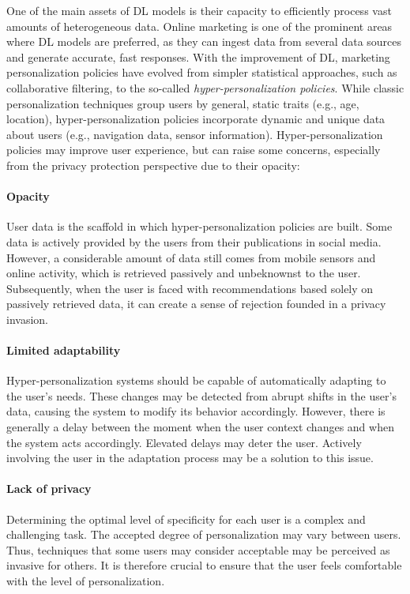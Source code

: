 One of the main assets of DL models is their capacity to efficiently process vast amounts of heterogeneous data. Online marketing is one of the prominent areas where DL models are preferred, as they can ingest data from several data sources and generate accurate, fast responses. With the improvement of DL, marketing personalization policies have evolved from simpler statistical approaches, such as collaborative filtering, to the so-called \textit{hyper-personalization policies}. While classic personalization techniques group users by general, static traits (e.g., age, location), hyper-personalization policies incorporate dynamic and unique data about users (e.g., navigation data, sensor information). Hyper-personalization policies may improve user experience, but can raise some concerns, especially from the privacy protection perspective due to their opacity:

\paragraph{Opacity}
User data is the scaffold in which hyper-personalization policies are built. Some data is actively provided by the users from their publications in social media. However, a considerable amount of data still comes from mobile sensors and online activity, which is retrieved passively and unbeknownst to the user. Subsequently, when the user is faced with recommendations based solely on passively retrieved data, it can create a sense of rejection founded in a privacy invasion.

\paragraph{Limited adaptability} 
Hyper-personalization systems should be capable of automatically adapting to the user's needs. These changes may be detected from abrupt shifts in the user's data, causing the system to modify its behavior accordingly. However, there is generally a delay between the moment when the user context changes and when the system acts accordingly. Elevated delays may deter the user. Actively involving the user in the adaptation process may be a solution to this issue.

\paragraph{Lack of privacy}
Determining the optimal level of specificity for each user is a complex and challenging task. The accepted degree of personalization may vary between users. Thus, techniques that some users may consider acceptable may be perceived as invasive for others. It is therefore crucial to ensure that the user feels comfortable with the level of personalization.

